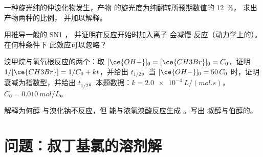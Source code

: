 \begin{exercise}[$\star\star$]\label{exo:b1:nucleophilic-substitution:9}
一种旋光纯的仲溴化物发生，产物
的旋光度为纯翻转所预期数值的 \qty{12}{\percent}，
求出产物两种的比例，
并加以解释。
\end{exercise}

\begin{exercise}[$\star\star\star$]\label{exo:b1:nucleophilic-substitution:10}
用推导一般的 SN1 ，
并证明在反应开始时加入离子  会减慢
反应（动力学上的）。在何种条件下
此效应可以忽略？
\end{exercise}

\begin{exercise}[$\star\star\star$]\label{exo:b1:nucleophilic-substitution:11}
溴甲烷与氢氧根反应的两个：取
$[\ce{OH-}]_0 = [\ce{CH3Br}]_0 = C_0$，证明 $1/[\ce{CH3Br}] = 1/C_0 +
kt$，并给出 $t_{1/2}$。当 $[\ce{OH-}]_0 = 50\,C_0$ 时，证明
衰减为指数型，并给出 $t_{1/2}$。本题数据：$k =
\qty{2.0e-4}{L/(mol.s)}$，$C_0 = \qty{0.010}{mol/L}$。
\end{exercise}

\begin{exercise}[$\star\star\star$]\label{exo:b1:nucleophilic-substitution:12}
解释为何醇  与溴化钠不反应，但
能与浓氢溴酸反应生成 。写出
叔醇与伯醇的。
\end{exercise}

\section{问题：叔丁基氯的溶剂解}

